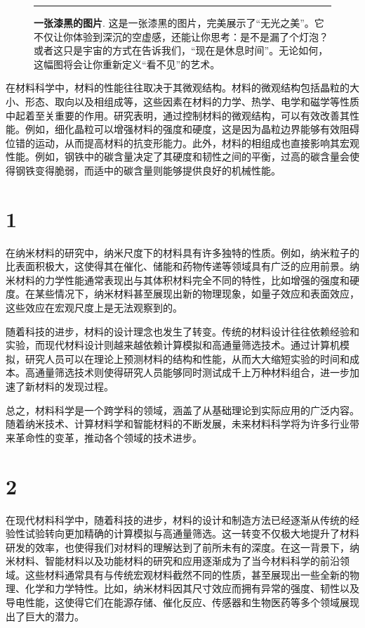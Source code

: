 \begin{multicols}{2}
\begin{figure*}\centering
    \rule{14cm}{176pt} %
    \caption{{\bf 一张漆黑的图片}. 这是一张漆黑的图片，完美展示了“无光之美”。它不仅让你体验到深沉的空虚感，还能让你思考：是不是漏了个灯泡？或者这只是宇宙的方式在告诉我们，“现在是休息时间”。无论如何，这幅图将会让你重新定义“看不见”的艺术。}
\end{figure*}
在材料科学中，材料的性能往往取决于其微观结构。材料的微观结构包括晶粒的大小、形态、取向以及相组成等，这些因素在材料的力学、热学、电学和磁学等性质中起着至关重要的作用。研究表明，通过控制材料的微观结构，可以有效改善其性能。例如，细化晶粒可以增强材料的强度和硬度，这是因为晶粒边界能够有效阻碍位错的运动，从而提高材料的抗变形能力。此外，材料的相组成也直接影响其宏观性能。例如，钢铁中的碳含量决定了其硬度和韧性之间的平衡，过高的碳含量会使得钢铁变得脆弱，而适中的碳含量则能够提供良好的机械性能。

\section{1}
在纳米材料的研究中，纳米尺度下的材料具有许多独特的性质。例如，纳米粒子的比表面积极大，这使得其在催化、储能和药物传递等领域具有广泛的应用前景。纳米材料的力学性能通常表现出与其体积材料完全不同的特性，比如增强的强度和硬度。在某些情况下，纳米材料甚至展现出新的物理现象，如量子效应和表面效应，这些效应在宏观尺度上是无法观察到的。

随着科技的进步，材料的设计理念也发生了转变。传统的材料设计往往依赖经验和实验，而现代材料设计则越来越依赖计算模拟和高通量筛选技术。通过计算机模拟，研究人员可以在理论上预测材料的结构和性能，从而大大缩短实验的时间和成本。高通量筛选技术则使得研究人员能够同时测试成千上万种材料组合，进一步加速了新材料的发现过程。

总之，材料科学是一个跨学科的领域，涵盖了从基础理论到实际应用的广泛内容。随着纳米技术、计算材料学和智能材料的不断发展，未来材料科学将为许多行业带来革命性的变革，推动各个领域的技术进步。

\section{2}
在现代材料科学中，随着科技的进步，材料的设计和制造方法已经逐渐从传统的经验性试验转向更加精确的计算模拟与高通量筛选。这一转变不仅极大地提升了材料研发的效率，也使得我们对材料的理解达到了前所未有的深度。在这一背景下，纳米材料、智能材料以及功能材料的研究和应用逐渐成为了当今材料科学的前沿领域。这些材料通常具有与传统宏观材料截然不同的性质，甚至展现出一些全新的物理、化学和力学特性。比如，纳米材料因其尺寸效应而拥有异常的强度、韧性以及导电性能，这使得它们在能源存储、催化反应、传感器和生物医药等多个领域展现出了巨大的潜力。


\end{multicols}
